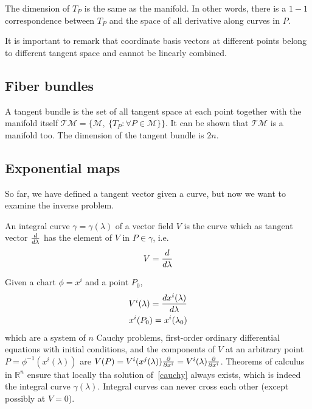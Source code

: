     The dimension of $T_P$ is the same as the manifold. In other words, there is a $1-1$ correspondence between $T_P$ and the space of all derivative along curves in $P$. 

    It is important to remark that coordinate basis vectors at different points belong to different tangent space and cannot be linearly combined.

\subsection{Fiber bundles}

    A tangent bundle is the set of all tangent space at each point together with the manifold itself $\mathcal T \mathcal M = \{\mathcal M, ~\{T_P \colon \forall P \in \mathcal M \}\}$. It can be shown that $\mathcal T \mathcal M$ is a manifold too. The dimension of the tangent bundle is $2n$. 

\subsection{Exponential maps}

    So far, we have defined a tangent vector given a curve, but now we want to examine the inverse problem. 
    
    \begin{definition}
        An integral curve $\gamma = \gamma(\lambda)$ of a vector field $V$ is the curve which as tangent vector $\frac{d}{d\lambda}$ has the element of $V$ in $P \in \gamma$, i.e. 
        \begin{equation*}
            V = \frac{d}{d\lambda}
        \end{equation*}
    \end{definition}

    Given a chart $\phi = x^i$ and a point $P_0$,
    \begin{equation} \label{cauchy}
        \begin{split}
            V^i(\lambda) = \frac{dx^i(\lambda)}{d\lambda} \\
            x^i(P_0) = x^i(\lambda_0)
        \end{split}
    \end{equation}
    which are a system of $n$ Cauchy problems, first-order ordinary differential equations with initial conditions, and the components of $V$ at an arbitrary point $P = \phi^{-1}(x^i(\lambda))$ are $V(P) = V^i(x^j(\lambda)) \frac{\partial}{\partial x^i} = V^i(\lambda) \frac{\partial}{\partial x^i}$. Theorems of calculus in $\mathbb R^n$ ensure that locally tha solution of~\eqref{cauchy} always exists, which is indeed the integral curve $\gamma(\lambda)$. Integral curves can never cross each other (except possibly at $V = 0$). 

